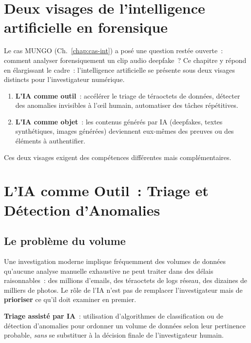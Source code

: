 \section*{Deux visages de l'intelligence artificielle en forensique}

Le cas MUNGO (Ch.~\ref{chap:cas-int}) a posé une question restée
ouverte~: comment analyser forensiquement un clip audio deepfake~?
Ce chapitre y répond en élargissant le cadre~: l'intelligence
artificielle se présente sous deux visages distincts pour
l'investigateur numérique.

\begin{enumerate}
    \item \textbf{L'IA comme outil}~: accélérer le triage de
          téraoctets de données, détecter des anomalies invisibles
          à l'\oe il humain, automatiser des tâches répétitives.
    \item \textbf{L'IA comme objet}~: les contenus générés par IA
          (deepfakes, textes synthétiques, images générées) deviennent
          eux-mêmes des preuves ou des éléments à authentifier.
\end{enumerate}

Ces deux visages exigent des compétences différentes mais
complémentaires.

\separateur

\section{L'IA comme Outil~: Triage et Détection d'Anomalies}
\label{sec:ia-outil}

\subsection{Le problème du volume}

Une investigation moderne implique fréquemment des volumes de données
qu'aucune analyse manuelle exhaustive ne peut traiter dans des délais
raisonnables~: des millions d'emails, des téraoctets de logs réseau,
des dizaines de milliers de photos. Le rôle de l'IA n'est pas de
remplacer l'investigateur mais de \textbf{prioriser} ce qu'il doit
examiner en premier.

\begin{boxdef}
\textbf{Triage assisté par IA}~:
utilisation d'algorithmes de classification ou de détection
d'anomalies pour ordonner un volume de données selon leur pertinence
probable, \emph{sans} se substituer à la décision finale de
l'investigateur humain.
\end{boxdef}

